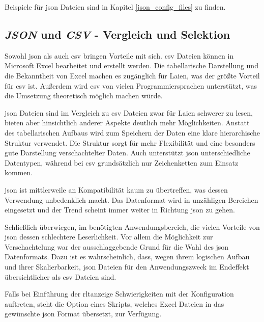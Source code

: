 Beispiele für \ac{json} Dateien sind in Kapitel \ref{json_config_files} zu finden.

\subsection{\textit{JSON} und \textit{CSV} - Vergleich und Selektion} \label{json_vs_csv}
Sowohl \ac{json} als auch \ac{csv} bringen Vorteile mit sich. 
\ac{csv} Dateien können in Microsoft Excel bearbeitet und erstellt werden. Die tabellarische Darstellung und die Bekanntheit von Excel machen es zugänglich für Laien, was der größte Vorteil für \ac{csv} ist. Außerdem wird \ac{csv} von vielen Programmiersprachen unterstützt, was die Umsetzung theoretisch möglich machen würde. 

\ac{json} Dateien sind im Vergleich zu \ac{csv} Dateien zwar für Laien schwerer zu lesen, bieten aber hinsichtlich anderer Aspekte deutlich mehr Möglichkeiten. Anstatt des tabellarischen Aufbaus wird zum Speichern der Daten eine klare hierarchische Struktur verwendet. Die Struktur sorgt für mehr Flexibilität und eine besonders gute Darstellung verschachtelter Daten. Auch unterstützt \ac{json} unterschiedliche Datentypen, während bei \ac{csv} grundsätzlich nur Zeichenketten zum Einsatz kommen.

\ac{json} ist mittlerweile an Kompatibilität kaum zu übertreffen, was dessen Verwendung unbedenklich macht. Das Datenformat wird in unzähligen Bereichen eingesetzt und der Trend scheint immer weiter in Richtung \ac{json} zu gehen.

Schließlich überwiegen, im benötigten Anwendungsbereich, die vielen Vorteile von \ac{json} dessen schlechtere Leserlichkeit. Vor allem die Möglichkeit zur Verschachtelung war der ausschlaggebende Grund für die Wahl des \ac{json} Datenformats. Dazu ist es wahrscheinlich, dass, wegen ihrem logischen Aufbau und ihrer Skalierbarkeit, \ac{json} Dateien für den Anwendungszweck im Endeffekt übersichtlicher als \ac{csv} Dateien sind.

Falls bei Einführung der \ac{rltanzeige} Schwierigkeiten mit der Konfiguration auftreten, steht \zB die Option eines Skripts, welches Excel Dateien in das gewünschte \ac{json} Format übersetzt, zur Verfügung.

